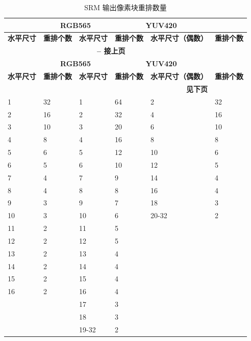\documentclass[main\_\_CN.tex]{subfiles}
\begin{document}
\begin{longtable}[c]{ |p{2cm}|p{2cm}|p{2cm}|p{2cm}|p{2cm}|p{2cm}| }
    \caption{SRM 输出像素块重排数量}
    \label{tab:srm_blk_ro_num}\\\hline

    \rowcolor{lightgray}
    \multicolumn{2}{|c|}{\textbf{ARGB8888/RGB888}} & \multicolumn{2}{c|}{\textbf{RGB565}} & \multicolumn{2}{c|}{\textbf{YUV420}} \\\hline
    \rowcolor{lightgray}
    \textbf{水平尺寸} & \textbf{重排个数} & \textbf{水平尺寸} & \textbf{重排个数} & \textbf{水平尺寸（偶数）} & \textbf{重排个数} \\\hline
    \endfirsthead


    \multicolumn{5}{c}{\bfseries \tablename\ \thetable{} -- 接上页}\\\hline
    \rowcolor{lightgray}
    \multicolumn{2}{|c|}{\textbf{ARGB8888/RGB888}} & \multicolumn{2}{c|}{\textbf{RGB565}} & \multicolumn{2}{c|}{\textbf{YUV420}} \\\hline
    \rowcolor{lightgray}
    \textbf{水平尺寸} & \textbf{重排个数} & \textbf{水平尺寸} & \textbf{重排个数} & \textbf{水平尺寸（偶数）} & \textbf{重排个数} \\\hline
    \endhead

    \multicolumn{5}{r}{\textbf{见下页}} \\
    \endfoot

    \endlastfoot

        1  & 32 & 1  & 64 & 2  & 32 \\\hline
        2  & 16 & 2  & 32 & 4  & 16 \\\hline
        3  & 10 & 3  & 20 & 6  & 10 \\\hline
        4  & 8  & 4  & 16 & 8  & 8  \\\hline
        5  & 6  & 5  & 12 & 10 & 6  \\\hline
        6  & 5  & 6  & 10 & 12 & 5  \\\hline
        7  & 4  & 7  & 9  & 14 & 4  \\\hline
        8  & 4  & 8  & 8  & 16 & 4  \\\hline
        9  & 3  & 9  & 7  & 18 & 3  \\\hline
        10 & 3  & 10 & 6  & 20-32 & 2 \\\hline
        11 & 2  & 11 & 5  &  &  \\\hline
        12 & 2  & 12 & 5  &  &  \\\hline
        13 & 2  & 13 & 4  &  &  \\\hline
        14 & 2  & 14 & 4  &  &  \\\hline
        15 & 2  & 15 & 4  &  &  \\\hline
        16 & 2  & 16 & 4  &  &  \\\hline
           &    & 17 & 3  &  &  \\\hline
           &    & 18 & 3  &  &  \\\hline
           &    & 19-32 & 2 &  &  \\\hline

\end{longtable}
\end{document}
